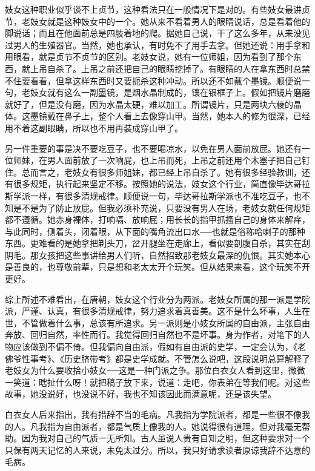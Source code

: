 妓女这种职业似乎谈不上贞节，这种看法只在一般情况下是对的。有些妓女最讲贞节，老妓女就是这种妓女中的一个。她从来不看着男人的眼睛说话，总是看着他的脚说话；而且在他面前总是四肢着地的爬。据她自己说，干了这么多年，从来没见过男人的生殖器官。当然，她也承认，有时免不了用手去拿。但她还说：用手拿和用眼看，就是贞节不贞节的区别。老妓女说，她有一位师姐，因为看到了那个东西，就上吊自杀了。上吊之前还把自己的眼睛挖掉了。有眼睛的人在拿东西时总禁不住要看看，但拿这样东西时又要扼杀这种冲动。所以还不如戴个墨镜。顺便说一句，老妓女就有这么一副墨镜，是烟水晶制成的，镶在银框子上。假如把镜片磨磨就好了，但是没有磨，因为水晶太硬，难以加工。所谓镜片，只是两块六棱的晶体。这墨镜戴在鼻子上，整个人看上去像穿山甲。当然，她本人的修为很深，已经用不着这副眼睛，所以也不用再装成穿山甲了。 

另一件重要的事是决不要吃豆子，也不要喝凉水，以免在男人面前放屁。她还有一位师妹，在男人面前放了一次响屁，也上吊而死，上吊之前还用个木塞子把自己钉住。总而言之，老妓女有很多师姐妹，都已经上吊自杀了。她有很多经验教训，还有很多规矩，执行起来坚定不移。按照她的说法，妓女这个行业，简直像毕达哥拉斯学派一样，有很多清规戒律。顺便说一句，毕达哥拉斯学派也不准吃豆子，也不知是不是为了防止放屁。但我必须补充说，只要没有男人在场，老妓女就任何规矩都不遵循。她赤身裸体，打响嗝、放响屁；用长长的指甲抓搔自己的身体来解痒，与此同时，侧着头，闭着眼，从下面的嘴角流出口水──也就是俗称哈喇子的那种东西。更难看的是她拿把剃头刀，岔开腿坐在走廊上，看似要剖腹自杀，其实在刮阴毛。那女孩把这些事讲给男人们听，自然招致那老妓女最深的仇恨。其实她本心是善良的，也尊敬前辈，只是想和老太太开个玩笑。但从结果来看，这个玩笑不开更好。 

综上所述不难看出，在唐朝，妓女这个行业分为两派。老妓女所属的那一派是学院派，严谨、认真，有很多清规戒律，努力追求着真善美。这不是什么坏事，人生在世，不管做着什么事，总该有所追求。另一派则是小妓女所属的自由派，主张自由奔放、回归自然，率性而行。我觉得回归自然也不是坏事。身为作者，对笔下的人物应该做到不偏不倚。但我偏向自由派，假如有自由派的史学，一定会认为，《老佛爷性事考》、《历史脐带考》都是史学成就。不管怎么说吧，这段说明总算解释了老妓女为什么要收拾小妓女──这是一种门派之争。那位白衣女人看到这里，微微一笑道：瞎扯什么呀！就把稿子放下来，说道：走吧，你表弟在等我们呢。对这些故事，她没说好，也没说不好，我也不知该因此而满意呢，还是该失望。 

白衣女人后来指出，我有措辞不当的毛病。凡我指为学院派者，都是一些很不像我的人。凡我指为自由派者，都是气质上像我的人。她说得很有道理，但对我毫无帮助。因为我对自己的气质一无所知。古人虽说人贵有自知之明，但这种要求对一个只保有两天记忆的人来说，未免太过分。所以，我只好请求读者原谅我辞不达意的毛病。 

